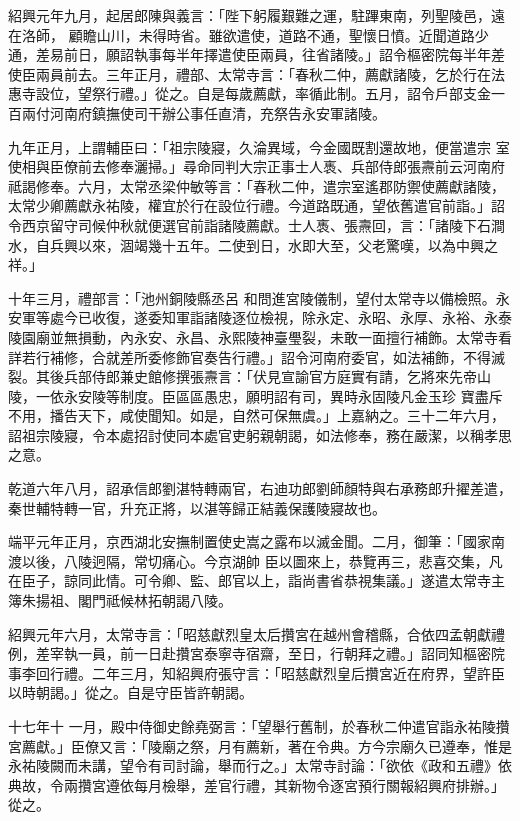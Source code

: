 \begin{pinyinscope}
 紹興元年九月，起居郎陳與義言：「陛下躬履艱難之運，駐蹕東南，列聖陵邑，遠在洛師，
 顧瞻山川，未得時省。雖欲遣使，道路不通，聖懷日憤。近聞道路少通，差易前日，願詔執事每半年擇遣使臣兩員，往省諸陵。」詔令樞密院每半年差使臣兩員前去。三年正月，禮部、太常寺言：「春秋二仲，薦獻諸陵，乞於行在法惠寺設位，望祭行禮。」從之。自是每歲薦獻，率循此制。五月，詔令戶部支金一百兩付河南府鎮撫使司干辦公事任直清，充祭告永安軍諸陵。



 九年正月，上謂輔臣曰：「祖宗陵寢，久淪異域，今金國既割還故地，便當遣宗
 室使相與臣僚前去修奉灑掃。」尋命同判大宗正事士人褭、兵部侍郎張燾前云河南府祗謁修奉。六月，太常丞梁仲敏等言：「春秋二仲，遣宗室遙郡防禦使薦獻諸陵，太常少卿薦獻永祐陵，權宜於行在設位行禮。今道路既通，望依舊遣官前詣。」詔令西京留守司候仲秋就便選官前詣諸陵薦獻。士人褭、張燾回，言：「諸陵下石澗水，自兵興以來，涸竭幾十五年。二使到日，水即大至，父老驚嘆，以為中興之祥。」



 十年三月，禮部言：「池州銅陵縣丞呂
 和問進宮陵儀制，望付太常寺以備檢照。永安軍等處今已收復，遂委知軍詣諸陵逐位檢視，除永定、永昭、永厚、永裕、永泰陵園廟並無損動，內永安、永昌、永熙陵神臺璺裂，未敢一面擅行補飾。太常寺看詳若行補修，合就差所委修飾官奏告行禮。」詔令河南府委官，如法補飾，不得滅裂。其後兵部侍郎兼史館修撰張燾言：「伏見宣諭官方庭實有請，乞將來先帝山陵，一依永安陵等制度。臣區區愚忠，願明詔有司，異時永固陵凡金玉珍
 寶盡斥不用，播告天下，咸使聞知。如是，自然可保無虞。」上嘉納之。三十二年六月，詔祖宗陵寢，令本處招討使同本處官吏躬親朝謁，如法修奉，務在嚴潔，以稱孝思之意。



 乾道六年八月，詔承信郎劉湛特轉兩官，右迪功郎劉師顏特與右承務郎升擢差遣，秦世輔特轉一官，升充正將，以湛等歸正結義保護陵寢故也。



 端平元年正月，京西湖北安撫制置使史嵩之露布以滅金聞。二月，御筆：「國家南渡以後，八陵迥隔，常切痛心。今京湖帥
 臣以圖來上，恭覽再三，悲喜交集，凡在臣子，諒同此情。可令卿、監、郎官以上，詣尚書省恭視集議。」遂遣太常寺主簿朱揚祖、閣門祗候林拓朝謁八陵。



 紹興元年六月，太常寺言：「昭慈獻烈皇太后攢宮在越州會稽縣，合依四孟朝獻禮例，差宰執一員，前一日赴攢宮泰寧寺宿齋，至日，行朝拜之禮。」詔同知樞密院事李回行禮。二年三月，知紹興府張守言：「昭慈獻烈皇后攢宮近在府界，望許臣以時朝謁。」從之。自是守臣皆許朝謁。



 十七年十
 一月，殿中侍御史餘堯弼言：「望舉行舊制，於春秋二仲遣官詣永祐陵攢宮薦獻。」臣僚又言：「陵廟之祭，月有薦新，著在令典。方今宗廟久已遵奉，惟是永祐陵闕而未講，望令有司討論，舉而行之。」太常寺討論：「欲依《政和五禮》依典故，令兩攢宮遵依每月檢舉，差官行禮，其新物令逐宮預行關報紹興府排辦。」從之。




\end{pinyinscope}
